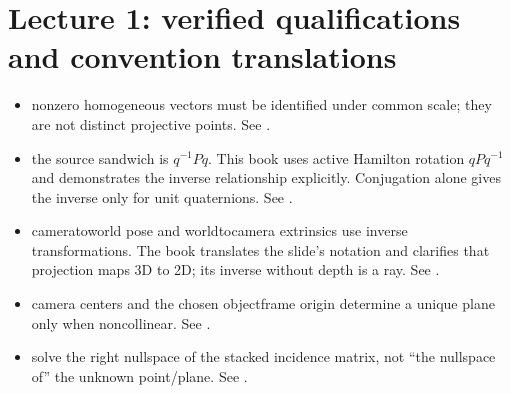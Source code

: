 \documentclass[letterpaper,11pt,english,openany,oneside]{jupyterBook}
\begin{document}
\section{Lecture 1: verified qualifications and convention translations}
\label{\detokenize{reference/errata:lecture-1-verified-qualifications-and-convention-translations}}\begin{itemize}
\item {}
\sphinxAtStartPar
{} nonzero homogeneous vectors must be identified under common scale; they are not distinct projective points. See {\hyperref[\detokenize{lectures/lecture01/projective:lec01-projective}]{}}.

\item {}
\sphinxAtStartPar
{} the source sandwich is \(q^{-1}Pq\). This book uses active Hamilton rotation \(qPq^{-1}\) and demonstrates the inverse relationship explicitly. Conjugation alone gives the inverse only for unit quaternions. See {\hyperref[\detokenize{lectures/lecture01/rotations:lec01-rotations}]{}}.

\item {}
\sphinxAtStartPar
{} camera\sphinxhyphen{}to\sphinxhyphen{}world pose and world\sphinxhyphen{}to\sphinxhyphen{}camera extrinsics use inverse transformations. The book translates the slide’s notation and clarifies that projection maps 3D to 2D; its inverse without depth is a ray. See {\hyperref[\detokenize{lectures/lecture01/cameras:lec01-cameras}]{}}.

\item {}
\sphinxAtStartPar
{} camera centers and the chosen object\sphinxhyphen{}frame origin determine a unique plane only when noncollinear. See {\hyperref[\detokenize{lectures/lecture01/quiz-workbook:ex-lec01-object-plane}]{}}.

\item {}
\sphinxAtStartPar
{} solve the right nullspace of the stacked incidence matrix, not “the nullspace of” the unknown point/plane. See {\hyperref[\detokenize{lectures/lecture01/planes-lines:lec01-planes}]{}}.

\end{itemize}
\end{document}
